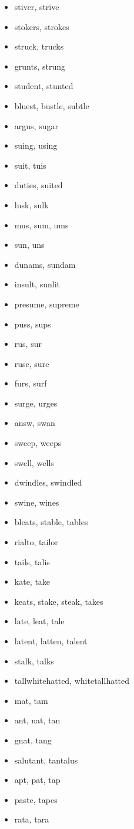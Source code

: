 \documentclass[a4wide,11pt]{report}
\begin{document}
\begin{itemize}
  \item stiver, strive
  \item stokers, strokes
  \item struck, trucks
  \item grunts, strung
  \item student, stunted
  \item bluest, bustle, subtle
  \item argus, sugar
  \item suing, using
  \item suit, tuis
  \item duties, suited
  \item lusk, sulk
  \item mus, sum, ums
  \item sun, uns
  \item dunams, sundam
  \item insult, sunlit
  \item presume, supreme
  \item puss, sups
  \item rus, sur
  \item ruse, sure
  \item furs, surf
  \item surge, urges
  \item answ, swan
  \item sweep, weeps
  \item swell, wells
  \item dwindles, swindled
  \item swine, wines
  \item bleats, stable, tables
  \item rialto, tailor
  \item tails, talis
  \item kate, take
  \item keats, stake, steak, takes
  \item late, leat, tale
  \item latent, latten, talent
  \item stalk, talks
  \item tallwhitehatted, whitetallhatted
  \item mat, tam
  \item ant, nat, tan
  \item gnat, tang
  \item salutant, tantalus
  \item apt, pat, tap
  \item paste, tapes
  \item rata, tara

\end{itemize}
\end{document}
